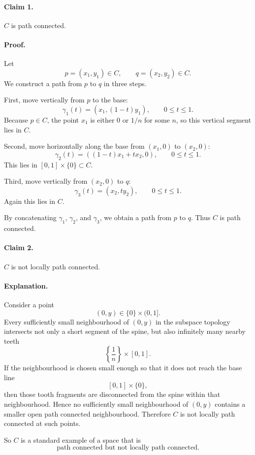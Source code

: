 \documentclass[12pt,a4paper]{article}
\theoremstyle{notespace}
\begin{document}
\paragraph{Claim 1.}
\(C\) is path connected.

\paragraph{Proof.}
Let
\[
p=(x_1,y_1)\in C,
\qquad
q=(x_2,y_2)\in C.
\]
We construct a path from \(p\) to \(q\) in three steps.

First, move vertically from \(p\) to the base:
\[
\gamma_1(t)=(x_1,(1-t)y_1),
\qquad
0\leq t\leq 1.
\]
Because \(p\in C\), the point \(x_1\) is either \(0\) or \(1/n\) for some \(n\), so this vertical segment lies in \(C\).

Second, move horizontally along the base from \((x_1,0)\) to \((x_2,0)\):
\[
\gamma_2(t)=((1-t)x_1+tx_2,0),
\qquad
0\leq t\leq 1.
\]
This lies in \([0,1]\times\{0\}\subset C\).

Third, move vertically from \((x_2,0)\) to \(q\):
\[
\gamma_3(t)=(x_2,ty_2),
\qquad
0\leq t\leq 1.
\]
Again this lies in \(C\).

By concatenating \(\gamma_1\), \(\gamma_2\), and \(\gamma_3\), we obtain a path from \(p\) to \(q\). Thus \(C\) is path connected.

\paragraph{Claim 2.}
\(C\) is not locally path connected.

\paragraph{Explanation.}
Consider a point
\[
(0,y)\in \{0\}\times(0,1].
\]
Every sufficiently small neighbourhood of \((0,y)\) in the subspace topology intersects not only a short segment of the spine, but also infinitely many nearby teeth
\[
\left\{\frac{1}{n}\right\}\times[0,1].
\]
If the neighbourhood is chosen small enough so that it does not reach the base line
\[
[0,1]\times\{0\},
\]
then those tooth fragments are disconnected from the spine within that neighbourhood. Hence no sufficiently small neighbourhood of \((0,y)\) contains a smaller open path connected neighbourhood. Therefore \(C\) is not locally path connected at such points.

So \(C\) is a standard example of a space that is
\[
\text{path connected but not locally path connected.}
\]
\end{document}
